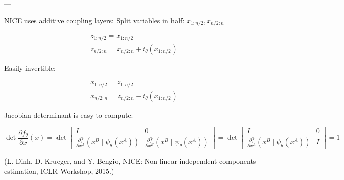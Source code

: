 \documentclass{report}
\begin{document}
--- 

\begin{definition}
    NICE uses additive coupling layers:
    Split variables in half: $x_{1: n / 2}, x_{n / 2: n}$

    $$
    \begin{aligned}
    & z_{1: n / 2}=x_{1: n / 2} \\
    & z_{n / 2: n}=x_{n / 2: n}+t_{\theta}\left(x_{1: n / 2}\right)
    \end{aligned}
    $$

    Easily invertible:

    $$
    \begin{aligned}
    & x_{1: n / 2}=z_{1: n / 2} \\
    & x_{n / 2: n}=z_{n / 2: n}-t_{\theta}\left(x_{1: n / 2}\right)
    \end{aligned}
    $$

    Jacobian determinant is easy to compute:

    $$
    \operatorname{det} \frac{\partial f_{\theta}}{\partial x}(x)=\operatorname{det}\left[\begin{array}{cc}I & 0 \\ \frac{\partial \hat{f}}{\partial x^{A}}\left(x^{B} \mid \psi_{\theta}\left(x^{A}\right)\right) & \frac{\partial \hat{f}}{\partial x^{B}}\left(x^{B} \mid \psi_{\theta}\left(x^{A}\right)\right)\end{array}\right]=\operatorname{det}\left[\begin{array}{cc}I & 0 \\ \frac{\partial \hat{f}}{\partial x^{A}}\left(x^{B} \mid \psi_{\theta}\left(x^{A}\right)\right) & I\end{array}\right]=1
    $$

    (L. Dinh, D. Krueger, and Y. Bengio, NICE: Non-linear independent components estimation, ICLR Workshop, 2015.)
\end{definition}
\end{document}
